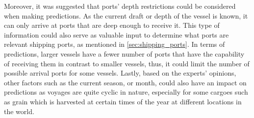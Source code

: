 Moreover, it was suggested that ports' depth restrictions could be considered when making predictions. As the current draft or depth of the vessel is known, it can only arrive at ports that are deep enough to receive it. This type of information could also serve as valuable input to determine what ports are relevant shipping ports, as mentioned in \cref{sec:shipping_ports}. In terms of predictions, larger vessels have a fewer number of ports that have the capability of receiving them in contrast to smaller vessels, thus, it could limit the number of possible arrival ports for some vessels. Lastly, based on the experts' opinions, other factors such as the current season, or month, could also have an impact on predictions as voyages are quite cyclic in nature, especially for some cargoes such as grain which is harvested at certain times of the year at different locations in the world.
